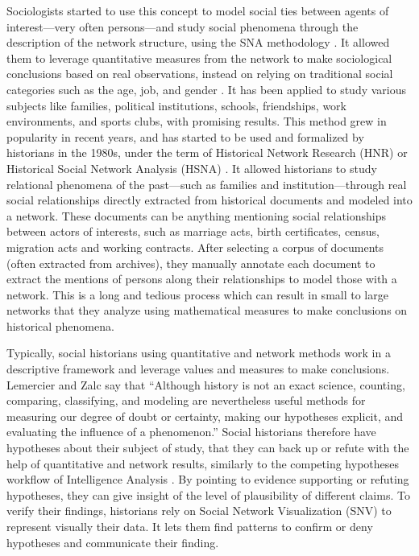 Sociologists started to use this concept to model social ties between agents of interest---very often persons---and study social phenomena through the description of the network structure, using the SNA methodology \cite{wassermanSocialNetworkAnalysis1994}.
It allowed them to leverage quantitative measures from the network to make sociological conclusions based on real observations, instead on relying on traditional social categories such as the age, job, and gender \cite{freemanDevelopmentSocialNetwork2004}.
It has been applied to study various subjects like families, political institutions, schools, friendships, work environments, and sports clubs, with promising results.
This method grew in popularity in recent years, and has started to be used and formalized by historians in the 1980s, under the term of Historical Network Research (HNR) or Historical Social Network Analysis (HSNA) \cite{wetherellHistoricalSocialNetwork1998}.
It allowed historians to study relational phenomena of the past---such as families and institution---through real social relationships directly extracted from historical documents and modeled into a network.
These documents can be anything mentioning social relationships between actors of interests, such as marriage acts, birth certificates, census, migration acts and working contracts.
After selecting a corpus of documents (often extracted from archives), they manually annotate each document to extract the mentions of persons along their relationships to model those with a network.
This is a long and tedious process which can result in small to large networks that they analyze using mathematical measures to make conclusions on historical phenomena.

Typically, social historians using quantitative and network methods work in a descriptive framework and leverage values and measures to make conclusions.
Lemercier and Zalc say that ``Although history is not an exact science, counting, comparing, classifying, and modeling are nevertheless useful methods for measuring our degree of doubt or certainty, making our hypotheses explicit, and evaluating the influence of a phenomenon.'' \cite{lemercierQuantitativeMethodsHumanities2019}
Social historians therefore have hypotheses about their subject of study, that they can back up or refute with the help of quantitative and network results, similarly to the competing hypotheses workflow of Intelligence Analysis \cite{dhamiAnalysisCompetingHypotheses2019}.
By pointing to evidence supporting or refuting hypotheses, they can give insight of the level of plausibility of different claims.
To verify their findings, historians rely on Social Network Visualization (SNV) to represent visually their data.
It lets them find patterns to confirm or deny hypotheses and communicate their finding.


